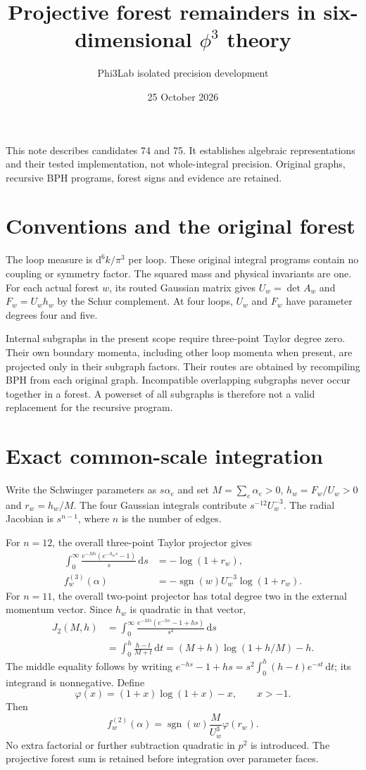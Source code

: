 \documentclass[11pt]{article}
\title{Projective forest remainders in six-dimensional $\phi^3$ theory}
\author{Phi3Lab isolated precision development}
\date{25 October 2026}
\newcommand{\ph}{\varphi}
\newcommand{\dd}{\,\mathrm{d}}
\begin{document}
\maketitle
\noindent
This note describes candidates 74 and 75. It establishes algebraic
representations and their tested implementation, not whole-integral precision.
Original graphs, recursive BPH programs, forest signs and evidence are retained.

\section{Conventions and the original forest}
The loop measure is $\mathrm{d}^6k/\pi^3$ per loop. These original integral
programs contain no coupling or symmetry factor. The squared mass and physical
invariants are one. For each actual forest $w$, its routed Gaussian matrix gives
$U_w=\det A_w$ and $F_w=U_w h_w$ by the Schur complement.
At four loops, $U_w$ and $F_w$ have parameter degrees four and five.

Internal subgraphs in the present scope require three-point Taylor degree zero.
Their own boundary momenta, including other loop momenta when present, are
projected only in their subgraph factors. Their routes are obtained by
recompiling BPH from each original graph. Incompatible overlapping subgraphs
never occur together in a forest. A powerset of all subgraphs is therefore
not a valid replacement for the recursive program.

\section{Exact common-scale integration}
Write the Schwinger parameters as $s\alpha_e$ and set
$M=\sum_e\alpha_e>0$, $h_w=F_w/U_w>0$ and $r_w=h_w/M$.
The four Gaussian integrals contribute $s^{-12}U_w^{-3}$.
The radial Jacobian is $s^{n-1}$, where $n$ is the number of edges.

For $n=12$, the overall three-point Taylor projector gives
\begin{align}
 \int_0^\infty \frac{e^{-Ms}(e^{-h_ws}-1)}{s}\dd s
 &=-\log(1+r_w),\\
 f_w^{(3)}(\alpha)&=-\operatorname{sgn}(w)U_w^{-3}\log(1+r_w).
\end{align}
For $n=11$, the overall two-point projector has total degree two
in the external momentum vector. Since $h_w$ is quadratic in that vector,
\begin{align}
 J_2(M,h)&=\int_0^\infty
   \frac{e^{-Ms}(e^{-hs}-1+hs)}{s^2}\dd s\\
 &=\int_0^h\frac{h-t}{M+t}\dd t
 =(M+h)\log(1+h/M)-h.
\end{align}
The middle equality follows by writing
$e^{-hs}-1+hs=s^2\int_0^h(h-t)e^{-st}\dd t$; its integrand is nonnegative.
Define
\[
 \ph(x)=(1+x)\log(1+x)-x,\qquad x>-1.
\]
Then
\[
 f_w^{(2)}(\alpha)=\operatorname{sgn}(w)
       \frac{M}{U_w^3}\ph(r_w).
\]
No extra factorial or further subtraction quadratic in $p^2$ is introduced.
The projective forest sum is retained before integration over parameter faces.
\end{document}
